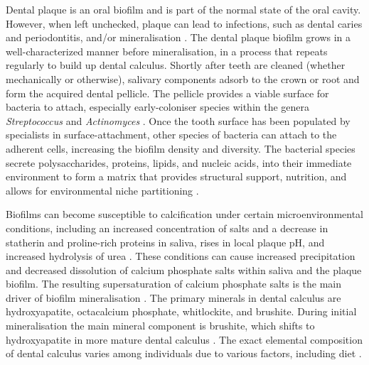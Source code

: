\documentclass[10pt,a4paper]{article}
\begin{document}
Dental plaque is an oral biofilm and is part of the normal state of the
oral cavity. However, when left unchecked, plaque can lead to
infections, such as dental caries and periodontitis, and/or
mineralisation \cite{marshDentalPlaque2006}. The dental plaque biofilm
grows in a well-characterized manner before mineralisation, in a process
that repeats regularly to build up dental calculus. Shortly after teeth
are cleaned (whether mechanically or otherwise), salivary components
adsorb to the crown or root and form the acquired dental pellicle. The
pellicle provides a viable surface for bacteria to attach, especially
early-coloniser species within the genera \emph{Streptococcus} and
\emph{Actinomyces} \cite{marshDentalPlaque2006}. Once the tooth surface
has been populated by specialists in surface-attachment, other species
of bacteria can attach to the adherent cells, increasing the biofilm
density and diversity. The bacterial species secrete polysaccharides,
proteins, lipids, and nucleic acids, into their immediate environment to
form a matrix that provides structural support, nutrition, and allows
for environmental niche partitioning
\cite{flemmingBiofilmsEmergent2016}.

Biofilms can become susceptible to calcification under certain
microenvironmental conditions, including an increased concentration of
salts and a decrease in statherin and proline-rich proteins in saliva,
rises in local plaque pH, and increased hydrolysis of urea
\cite{whiteDentalCalculus1997, wongCalciumPhosphate2002}. These
conditions can cause increased precipitation and decreased dissolution
of calcium phosphate salts within saliva and the plaque biofilm. The
resulting supersaturation of calcium phosphate salts is the main driver
of biofilm mineralisation \cite{jinSupragingivalCalculus2002}. The
primary minerals in dental calculus are hydroxyapatite, octacalcium
phosphate, whitlockite, and brushite. During initial mineralisation the
main mineral component is brushite, which shifts to hydroxyapatite in
more mature dental calculus
\cite{jinSupragingivalCalculus2002, hayashizakiSiteSpecific2008}. The
exact elemental composition of dental calculus varies among individuals
due to various factors, including diet
\cite{hayashizakiSiteSpecific2008, jiFluorideMagnesium2000}.
\end{document}
